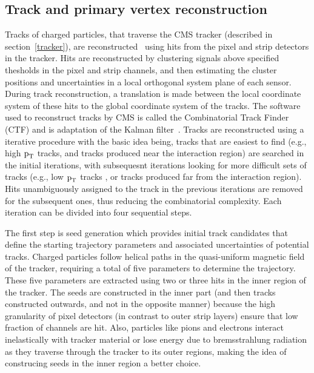 \subsection{Track and primary vertex reconstruction}
\label{track_recon}

Tracks of charged particles, that traverse the CMS tracker (described in section~\ref{tracker}), are reconstructed~\cite{track_reconstruction} using hits from the pixel and strip detectors in the tracker. Hits are reconstructed by clustering signals above specified thesholds in the pixel and strip channels, and then estimating the cluster positions and uncertainties in a local orthogonal system plane of each sensor. During track reconstruction, a translation is made between the local coordinate system of these hits to the global coordinate system of the tracks. The software used to reconstruct tracks by CMS is called the Combinatorial Track Finder (CTF) and is adaptation of the Kalman filter~\cite{kalman_filter}. Tracks are reconstructed using a iterative procedure with the basic idea being, tracks that are easiest to find (e.g., high $\text{p}_\text{T}$ tracks, and tracks produced near the interaction region) are searched in the initial iterations, with subsequesnt iterations looking for more difficult sets of tracks (e.g., low $\text{p}_\text{T}$ tracks , or tracks produced far from the interaction region). Hits unambiguously assigned to the track in the previous iterations are removed for the subsequent ones, thus reducing the combinatorial complexity. Each iteration can be divided into four sequential steps.

The first step is seed generation which provides initial track candidates that define the starting trajectory parameters and associated uncertainties of potential tracks. Charged particles follow helical paths in the quasi-uniform magnetic field of the tracker, requiring a total of five parameters to determine the trajectory. These five parameters are extracted using two or three hits in the inner region of the tracker. The seeds are constructed in the inner part (and then tracks constructed outwards, and not in the opposite manner) because the high granularity of pixel detectors (in contrast to outer strip layers)  ensure that low fraction of channels are hit. Also, particles like pions and electrons interact inelastically with tracker material or lose energy due to bremsstrahlung radiation as they traverse through the tracker to its outer regions, making the idea of construcing seeds in the inner region a better choice.

